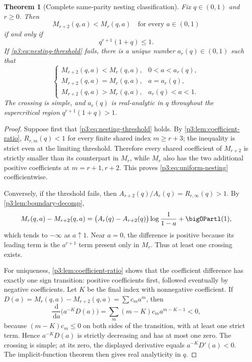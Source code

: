 \documentclass[11pt]{article}
\numberwithin{equation}{section}
\newtheorem{theorem}{Theorem}[section]
\theoremstyle{definition}
\theoremstyle{remark}
\newcommand{\dd}{\,\mathrm d}
\begin{document}
\begin{theorem}[Complete same-parity nesting classification]\label{p3:thm:nesting-classification}
Fix $q\in(0,1)$ and $r\ge0$.  Then
\begin{equation}
 M_{r+2}(q,a)<M_r(q,a)\quad\text{for every }a\in(0,1)
 \label{p3:eq:uniform-nesting}
\end{equation}
if and only if
\begin{equation}
 \boxed{q^{r+1}(1+q)\le1.}
 \label{p3:eq:nesting-threshold}
\end{equation}
If \eqref{p3:eq:nesting-threshold} fails, there is a unique number
$a_r(q)\in(0,1)$ such that
\begin{equation}
 \begin{cases}
 M_{r+2}(q,a)<M_r(q,a),&0<a<a_r(q),\\
 M_{r+2}(q,a)=M_r(q,a),&a=a_r(q),\\
 M_{r+2}(q,a)>M_r(q,a),&a_r(q)<a<1.
 \end{cases}
 \label{p3:eq:crossing-classification}
\end{equation}
The crossing is simple, and $a_r(q)$ is real-analytic in $q$ throughout the supercritical
region $q^{r+1}(1+q)>1$.
\end{theorem}

\begin{proof}
Suppose first that \eqref{p3:eq:nesting-threshold} holds.  By
\cref{p3:lem:coefficient-ratio}, $R_{r,m}(q)<1$ for every finite shared index
$m\ge r+3$; the inequality is strict even at the limiting threshold.  Therefore every shared
coefficient of $M_{r+2}$ is strictly smaller than its counterpart in $M_r$, while $M_r$ also
has the two additional positive coefficients at $m=r+1,r+2$.  This proves
\eqref{p3:eq:uniform-nesting} coefficientwise.

Conversely, if the threshold fails, then $A_{r+2}(q)/A_r(q)=R_{r,\infty}(q)>1$.
By \cref{p3:lem:boundary-decomp},
\[
 M_r(q,a)-M_{r+2}(q,a)
 =\bigl(A_r(q)-A_{r+2}(q)\bigr)\log\frac1{1-a}+\bigOPartl(1),
\]
which tends to $-\infty$ as $a\uparrow1$.  Near $a=0$, the difference is positive because
its leading term is the $a^{r+1}$ term present only in $M_r$.  Thus at least one crossing
exists.

For uniqueness, \cref{p3:lem:coefficient-ratio} shows that the coefficient difference has
exactly one sign transition: positive coefficients first, followed eventually by negative
coefficients.  Let $K$ be the final index with nonnegative coefficient.  If
$D(a)=M_r(q,a)-M_{r+2}(q,a)=\sum c_ma^m$, then
\[
 \frac{\dd}{\dd a}\bigl(a^{-K}D(a)\bigr)
 =\sum_m(m-K)c_ma^{m-K-1}<0,
 \]
because $(m-K)c_m\le0$ on both sides of the transition, with at least one strict term.
Hence $a^{-K}D(a)$ is strictly decreasing and has at most one zero.  The crossing is simple;
at its zero, the displayed derivative equals $a^{-K}D'(a)<0$.  The implicit-function theorem
then gives real analyticity in $q$.
\end{proof}
\end{document}
